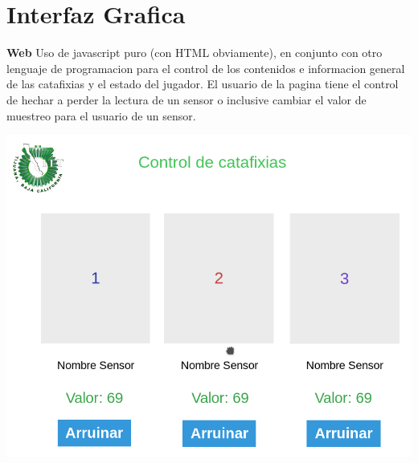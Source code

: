 \documentclass{article}
\begin{document}
\newpage
\section{Interfaz Grafica}
\textbf{Web}
\newline Uso de javascript puro (con HTML obviamente), en conjunto con otro lenguaje de programacion para el control de los contenidos e informacion general de las catafixias y el estado del jugador.
\newline El usuario de la pagina tiene el control de hechar a perder la lectura de un sensor o inclusive cambiar el valor de muestreo para el usuario de un sensor.

\includegraphics[width=\linewidth]{Bosquejo}
\end{document}
